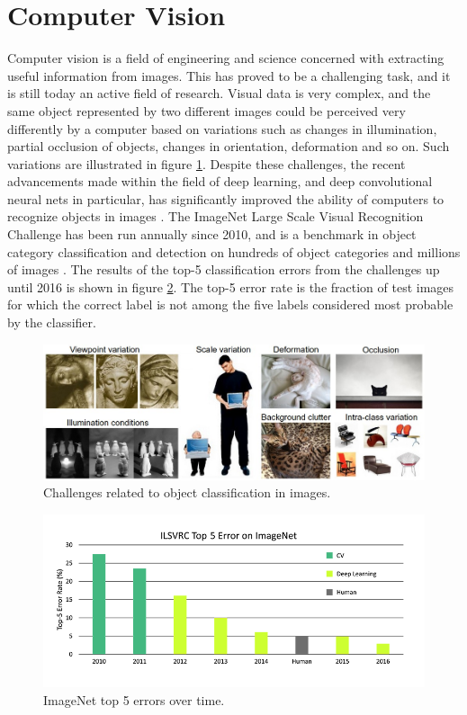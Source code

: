 \section{Computer Vision}
Computer vision is a field of engineering and science concerned with extracting useful information from images. This has proved to be a challenging task, and it is still today an active field of research. Visual data is very complex, and the same object represented by two different images could be perceived very differently by a computer based on variations such as changes in illumination, partial occlusion of objects, changes in orientation, deformation and so on. Such variations are illustrated in figure \ref{fig:cv_challenges}. Despite these challenges, the recent advancements made within the field of deep learning, and deep convolutional neural nets in particular, has significantly improved the ability of computers to recognize objects in images \cite{LeCun2015deepL}. The ImageNet Large Scale Visual Recognition Challenge has been run annually since 2010, and is a benchmark in object category classification and detection on hundreds of object categories and millions of images \cite{ILSVRC15}. The results of the top-5 classification errors from the challenges up until 2016 is shown in figure \ref{fig:imagenet_top_5}. The top-5 error rate is the fraction of test images for which the correct label is not among the five labels considered most probable by the classifier.
\begin{figure}[H]
    \centering
    \includegraphics[width=.8\linewidth]{fig/challenges.jpeg}
    \caption{Challenges related to object classification in images.\protect\footnotemark}
    \label{fig:cv_challenges}
\end{figure}
\begin{figure}[H]
    \centering
    \includegraphics[width=.8\linewidth]{fig/imagenet_top_5.png}
    \caption{ImageNet top 5 errors over time.\protect\footnotemark}
    \label{fig:imagenet_top_5}
\end{figure}
